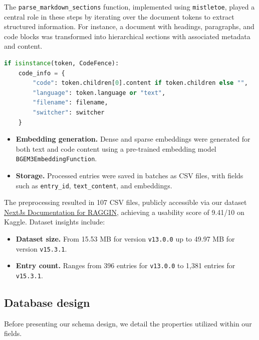 The \texttt{parse\_markdown\_sections} function, implemented using \texttt{mistletoe}, played a central role in these steps by iterating over the document tokens to extract structured information. For instance, a document with headings, paragraphs, and code blocks was transformed into hierarchical sections with associated metadata and content.

\begin{lstlisting}[language=Python, caption=Code snippet parsing]
	if isinstance(token, CodeFence):
	code_info = {
		"code": token.children[0].content if token.children else "",
		"language": token.language or "text",
		"filename": filename,
		"switcher": switcher
	}
\end{lstlisting}

\begin{itemize}
	\item \textbf{Embedding generation.} 
	Dense and sparse embeddings were generated for both text and code content using a pre-trained embedding model \texttt{BGEM3EmbeddingFunction}.
	
	\item \textbf{Storage.} 
	Processed entries were saved in batches as CSV files, with fields such as \texttt{entry\_id}, \texttt{text\_content}, and embeddings.
\end{itemize}

The preprocessing resulted in 107 CSV files, publicly accessible via our dataset \href{https://www.kaggle.com/datasets/jiyujizai/nextjs-documentation-for-raggin}{NextJs Documentation for RAGGIN}, achieving a usability score of 9.41/10 on Kaggle. Dataset insights include:

\begin{itemize}
	\item \textbf{Dataset size.} From 15.53 MB for version \texttt{v13.0.0} up to 49.97 MB for version \texttt{v15.3.1}.
	\item \textbf{Entry count.} Ranges from 396 entries for \texttt{v13.0.0} to 1,381 entries for \texttt{v15.3.1}.
\end{itemize}

\subsection{Database design} \label{sec:database_design}

Before presenting our schema design, we detail the properties utilized within our fields.

